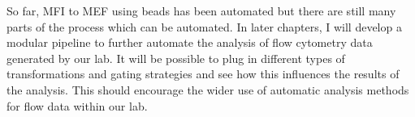 
So far, MFI to MEF using beads has been automated but there are still many parts of the process which can be automated.
In later chapters, I will develop a modular pipeline to further automate the analysis of flow cytometry data generated by our lab.
It will be possible to plug in different types of transformations and gating strategies and see how this influences
the results of the analysis.
This should encourage the wider use of automatic analysis methods for flow data within our lab.




